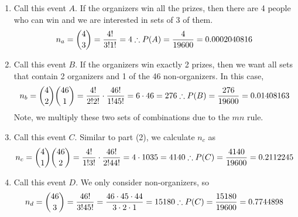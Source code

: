 \documentclass[11pt]{article}
\theoremstyle{definition}
\begin{document}
\begin{enumerate}
	\item Call this event $A$. If the organizers win all the prizes, then there are 4 people who can win and we are interested in sets of 3 of them.
	$$
		n_a = {4 \choose 3} = \frac{4!}{3!1!} = 4 \\
		\therefore P(A) = \frac{4}{19600} = 0.0002040816
	$$
	\item Call this event $B$. If the organizers win exactly 2 prizes, then we want all sets that contain 2 organizers and 1 of the 46 non-organizers. In this case,
	$$
		n_b = {4 \choose 2} {46 \choose 1} = \frac{4!}{2!2!} \cdot \frac{46!}{1!45!} = 6 \cdot 46 = 276 \\
		\therefore P(B) =  \frac{276}{19600} = 0.01408163
	$$
	Note, we multiply these two sets of combinations due to the $mn$ rule.
	\item Call this event $C$. Similar to part (2), we calculate $n_c$ as
	$$
		n_c = {4 \choose 1} {46 \choose 2} = \frac{4!}{1!3!} \cdot \frac{46!}{2!44!} = 4 \cdot 1035 = 4140 \\
		\therefore P(C) =  \frac{4140}{19600} = 0.2112245
	$$
	\item Call this event $D$. We only consider non-organizers, so
	$$
		n_d = {46 \choose 3} = \frac{46!}{3!45!} = \frac{46 \cdot 45 \cdot 44}{3 \cdot 2 \cdot 1} = 15180 \\
		\therefore P(C) =  \frac{15180}{19600} = 0.7744898
	$$
\end{enumerate}
\end{document}
